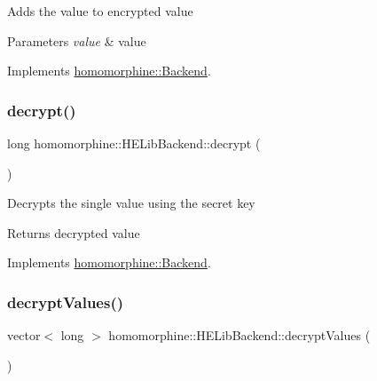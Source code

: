 Adds the value to encrypted value


\begin{DoxyParams}{Parameters}
{\em value} & value \\
\hline
\end{DoxyParams}


Implements \mbox{\hyperlink{classhomomorphine_1_1_backend_a7175812578b22d9ff19d49760cb04b26}{homomorphine\+::\+Backend}}.

\mbox{\label{classhomomorphine_1_1_h_e_lib_backend_a2cd3ebc5a3332100e6cb24480262c395}} 
\subsubsection{\texorpdfstring{decrypt()}{decrypt()}}
{\footnotesize\ttfamily long homomorphine\+::\+H\+E\+Lib\+Backend\+::decrypt (\begin{DoxyParamCaption}{ }\end{DoxyParamCaption})\hspace{0.3cm}{\ttfamily [virtual]}}

Decrypts the single value using the secret key

\begin{DoxyReturn}{Returns}
decrypted value 
\end{DoxyReturn}


Implements \mbox{\hyperlink{classhomomorphine_1_1_backend_ae5c5de7bddabef1bd9a935be5bbd9646}{homomorphine\+::\+Backend}}.

\mbox{\label{classhomomorphine_1_1_h_e_lib_backend_a650d87bee6056a404f8ab81ec0f84980}} 
\subsubsection{\texorpdfstring{decryptValues()}{decryptValues()}}
{\footnotesize\ttfamily vector$<$ long $>$ homomorphine\+::\+H\+E\+Lib\+Backend\+::decrypt\+Values (\begin{DoxyParamCaption}{ }\end{DoxyParamCaption})\hspace{0.3cm}{\ttfamily [virtual]}}

